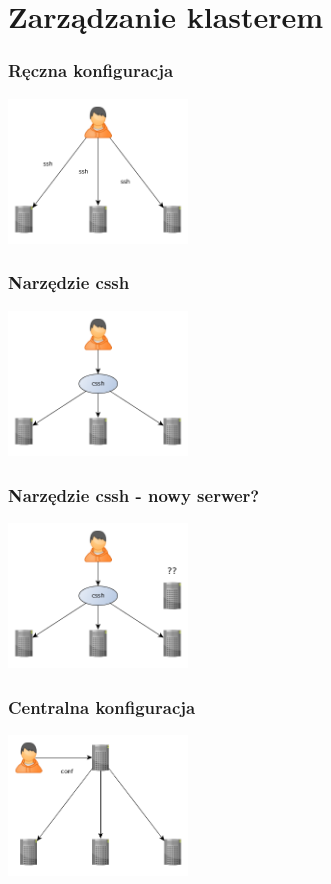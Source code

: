 \documentclass[12pt]{beamer}
\begin{document}
\section{Zarządzanie klasterem}
\begin{frame}
\frametitle{Ręczna konfiguracja}
\begin{center}
\includegraphics[width=180px]{img/zarzadzanie1.png}
\end{center}
\end{frame}
\begin{frame}
\frametitle{Narzędzie cssh}
\begin{center}
\includegraphics[width=180px]{img/zarzadzanie2.png}
\end{center}
\end{frame}
\begin{frame}
\frametitle{Narzędzie cssh - nowy serwer?}
\begin{center}
\includegraphics[width=180px]{img/zarzadzanie3.png}
\end{center}
\end{frame}
\begin{frame}
\frametitle{Centralna konfiguracja}
\begin{center}
\includegraphics[width=180px]{img/zarzadzanie4.png}
\end{center}
\end{frame}
\end{document}
